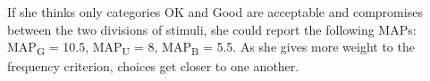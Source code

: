 If she thinks only categories OK and Good are acceptable and compromises between the two divisions of stimuli, she could report the following MAPs: MAP\textsubscript{G} = 10.5, MAP\textsubscript{U} = 8, MAP\textsubscript{B} = 5.5.
As she gives more weight to the frequency criterion, choices get closer to one another.



